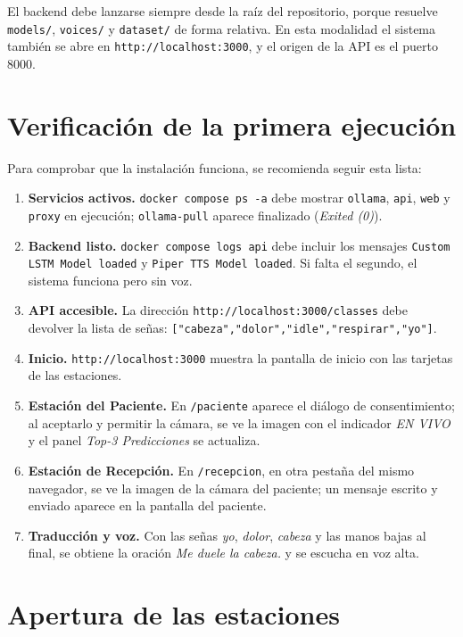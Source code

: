 El backend debe lanzarse siempre desde la raíz del repositorio, porque resuelve \texttt{models/}, \texttt{voices/} y \texttt{dataset/} de forma relativa. En esta modalidad el sistema también se abre en \texttt{http://localhost:3000}, y el origen de la API es el puerto 8000.

\section{Verificación de la primera ejecución}

Para comprobar que la instalación funciona, se recomienda seguir esta lista:

\begin{enumerate}
  \item \textbf{Servicios activos.} \texttt{docker compose ps -a} debe mostrar \texttt{ollama}, \texttt{api}, \texttt{web} y \texttt{proxy} en ejecución; \texttt{ollama-pull} aparece finalizado (\emph{Exited (0)}).
  \item \textbf{Backend listo.} \texttt{docker compose logs api} debe incluir los mensajes \texttt{Custom LSTM Model loaded} y \texttt{Piper TTS Model loaded}. Si falta el segundo, el sistema funciona pero sin voz.
  \item \textbf{API accesible.} La dirección \texttt{http://localhost:3000/classes} debe devolver la lista de señas: \texttt{["cabeza","dolor","idle","respirar","yo"]}.
  \item \textbf{Inicio.} \texttt{http://localhost:3000} muestra la pantalla de inicio con las tarjetas de las estaciones.
  \item \textbf{Estación del Paciente.} En \texttt{/paciente} aparece el diálogo de consentimiento; al aceptarlo y permitir la cámara, se ve la imagen con el indicador \emph{EN VIVO} y el panel \emph{Top-3 Predicciones} se actualiza.
  \item \textbf{Estación de Recepción.} En \texttt{/recepcion}, en otra pestaña del mismo navegador, se ve la imagen de la cámara del paciente; un mensaje escrito y enviado aparece en la pantalla del paciente.
  \item \textbf{Traducción y voz.} Con las señas \emph{yo}, \emph{dolor}, \emph{cabeza} y las manos bajas al final, se obtiene la oración \emph{Me duele la cabeza.} y se escucha en voz alta.
\end{enumerate}

\section{Apertura de las estaciones}

